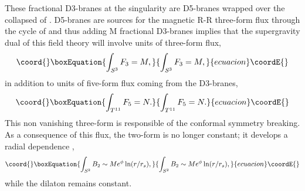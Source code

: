 \documentclass[12pt,epsf,a4paper]{article}
\begin{document}
These fractional D3-branes at the singularity are D5-branes wrapped over the 
collapsed \coordHE{} of \coordHE{}. D5-branes are sources for 
the magnetic R-R three-form flux through the \coordHE{} cycle of \coordHE{} and thus 
adding M fractional D3-branes implies that  the supergravity dual 
of this field theory will involve \coordHE{} units of three-form flux,
\begin{equation}\coord{}\boxEquation{
\int_{S^3} F_3 = M,
\label{2}
}{
\int_{S^3} F_3 = M,
}{ecuacion}\coordE{}\end{equation}
in addition to  \coordHE{} units of five-form flux coming from the D3-branes,
\begin{equation}\coord{}\boxEquation{
\int_{T^{11}} F_5 = N.
\label{3}
}{
\int_{T^{11}} F_5 = N.
}{ecuacion}\coordE{}\end{equation}
This non vanishing three-form is  responsible of the conformal symmetry 
breaking. As a consequence of this flux, the two-form \coordHE{} is no longer constant; it 
develops a radial dependence \cite{KN},
\begin{equation}\coord{}\boxEquation{
\int_{S^2} B_2 \sim M e^{\phi} \ln (r/r_s),
\label{4}
}{
\int_{S^2} B_2 \sim M e^{\phi} \ln (r/r_s),
}{ecuacion}\coordE{}\end{equation}
while the dilaton remains constant.
  
\end{document}
